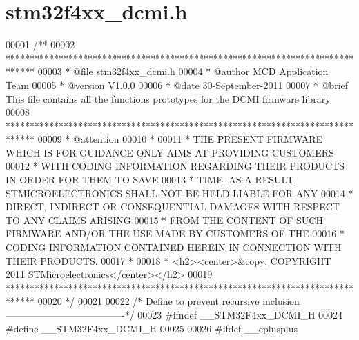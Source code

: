 \section{stm32f4xx\+\_\+dcmi.\+h}
\label{stm32f4xx__dcmi_8h_source}

\begin{DoxyCode}
00001 \textcolor{comment}{/**}
00002 \textcolor{comment}{  ******************************************************************************}
00003 \textcolor{comment}{  * @file    stm32f4xx\_dcmi.h}
00004 \textcolor{comment}{  * @author  MCD Application Team}
00005 \textcolor{comment}{  * @version V1.0.0}
00006 \textcolor{comment}{  * @date    30-September-2011}
00007 \textcolor{comment}{  * @brief   This file contains all the functions prototypes for the DCMI firmware library.}
00008 \textcolor{comment}{  ******************************************************************************}
00009 \textcolor{comment}{  * @attention}
00010 \textcolor{comment}{  *}
00011 \textcolor{comment}{  * THE PRESENT FIRMWARE WHICH IS FOR GUIDANCE ONLY AIMS AT PROVIDING CUSTOMERS}
00012 \textcolor{comment}{  * WITH CODING INFORMATION REGARDING THEIR PRODUCTS IN ORDER FOR THEM TO SAVE}
00013 \textcolor{comment}{  * TIME. AS A RESULT, STMICROELECTRONICS SHALL NOT BE HELD LIABLE FOR ANY}
00014 \textcolor{comment}{  * DIRECT, INDIRECT OR CONSEQUENTIAL DAMAGES WITH RESPECT TO ANY CLAIMS ARISING}
00015 \textcolor{comment}{  * FROM THE CONTENT OF SUCH FIRMWARE AND/OR THE USE MADE BY CUSTOMERS OF THE}
00016 \textcolor{comment}{  * CODING INFORMATION CONTAINED HEREIN IN CONNECTION WITH THEIR PRODUCTS.}
00017 \textcolor{comment}{  *}
00018 \textcolor{comment}{  * <h2><center>&copy; COPYRIGHT 2011 STMicroelectronics</center></h2>}
00019 \textcolor{comment}{  ******************************************************************************}
00020 \textcolor{comment}{  */}
00021 
00022 \textcolor{comment}{/* Define to prevent recursive inclusion -------------------------------------*/}
00023 \textcolor{preprocessor}{#}\textcolor{preprocessor}{ifndef} \textcolor{preprocessor}{\_\_STM32F4xx\_DCMI\_H}
00024 \textcolor{preprocessor}{#}\textcolor{preprocessor}{define} \textcolor{preprocessor}{\_\_STM32F4xx\_DCMI\_H}
00025 
00026 \textcolor{preprocessor}{#}\textcolor{preprocessor}{ifdef} \_\_cplusplus

\end{DoxyCode}

